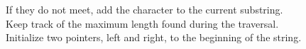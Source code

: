 \documentclass[preview]{standalone}
\begin{document}
If they do not meet, add the character to the current substring.\\Keep track of the maximum length found during the traversal.\\Initialize two pointers, left and right, to the beginning of the string.\\
\end{document}
